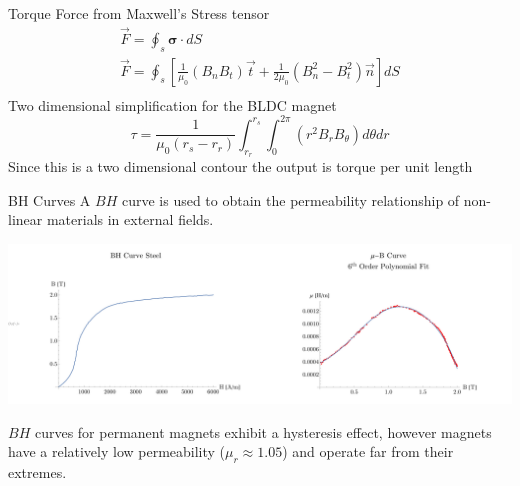 \documentclass{beamer}
\begin{document}
    \begin{frame}{Torque}
        Force from Maxwell's Stress tensor
        \begin{gather*}
            \vec{F}=\oint_{s} \mathbf{\sigma} \cdot d S\\
            \vec{F}=\oint_{s}\left[\frac{1}{\mu_{0}}\left(B_{n} B_{t}\right) \vec{t}+\frac{1}{2 \mu_{0}}\left(B_{n}^{2}-B_{t}^{2}\right) \vec{n}\right] d S\\
        \end{gather*}
        Two dimensional simplification for the BLDC magnet
        \begin{equation*}
            \tau=\frac{1}{\mu_{0}\left(r_{s}-r_{r}\right)} \int_{r_{r}}^{r_{s}} \int_{0}^{2 \pi}\left(r^2 B_{r} B_{\theta}\right) d\theta dr
        \end{equation*}
        Since this is a two dimensional contour the output is torque per unit length
    \end{frame}
    
    \begin{frame}{BH Curves}
        A $BH$ curve is used to obtain the permeability relationship of non-linear materials in external fields.
        \begin{center}
            \hspace*{-0.7in}
            \includegraphics[width = 5.5 in]{bhcurve.pdf}
        \end{center}
        $BH$ curves for permanent magnets exhibit a hysteresis effect, however magnets have a relatively low permeability ($\mu_r\approx1.05$) and operate far from their extremes.
    \end{frame}
    
\end{document}
